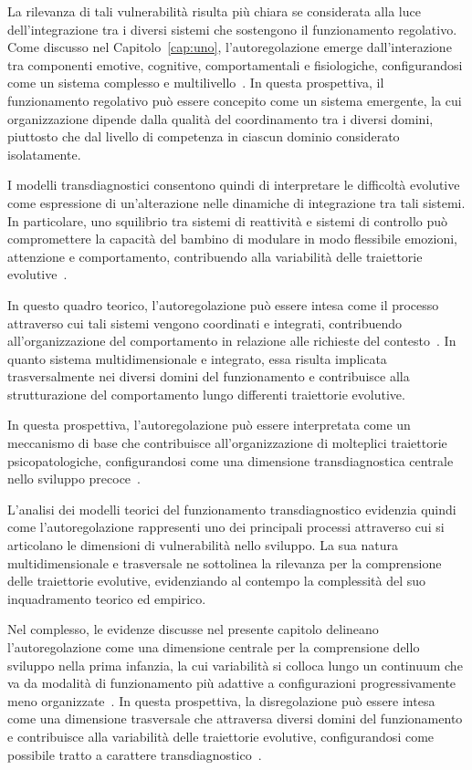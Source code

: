             La rilevanza di tali vulnerabilità risulta più chiara se considerata alla luce dell'integrazione tra i diversi sistemi che sostengono il funzionamento regolativo. Come discusso nel Capitolo~\ref{cap:uno}, l'autoregolazione emerge dall'interazione tra componenti emotive, cognitive, comportamentali e fisiologiche, configurandosi come un sistema complesso e multilivello~\cite{beauchaine2019,zelazo2015}. In questa prospettiva, il funzionamento regolativo può essere concepito come un sistema emergente, la cui organizzazione dipende dalla qualità del coordinamento tra i diversi domini, piuttosto che dal livello di competenza in ciascun dominio considerato isolatamente.

            I modelli transdiagnostici consentono quindi di interpretare le difficoltà evolutive come espressione di un'alterazione nelle dinamiche di integrazione tra tali sistemi. In particolare, uno squilibrio tra sistemi di reattività e sistemi di controllo può compromettere la capacità del bambino di modulare in modo flessibile emozioni, attenzione e comportamento, contribuendo alla variabilità delle traiettorie evolutive~\cite{beauchaine2019,zelazo2015}.

            In questo quadro teorico, l'autoregolazione può essere intesa come il processo attraverso cui tali sistemi vengono coordinati e integrati, contribuendo all'organizzazione del comportamento in relazione alle richieste del contesto~\cite{beauchaine2019}. In quanto sistema multidimensionale e integrato, essa risulta implicata trasversalmente nei diversi domini del funzionamento e contribuisce alla strutturazione del comportamento lungo differenti traiettorie evolutive.

            In questa prospettiva, l'autoregolazione può essere interpretata come un meccanismo di base che contribuisce all'organizzazione di molteplici traiettorie psicopatologiche, configurandosi come una dimensione transdiagnostica centrale nello sviluppo precoce~\cite{dalgleish2020}.

            L'analisi dei modelli teorici del funzionamento transdiagnostico evidenzia quindi come l'autoregolazione rappresenti uno dei principali processi attraverso cui si articolano le dimensioni di vulnerabilità nello sviluppo. La sua natura multidimensionale e trasversale ne sottolinea la rilevanza per la comprensione delle traiettorie evolutive, evidenziando al contempo la complessità del suo inquadramento teorico ed empirico.

            Nel complesso, le evidenze discusse nel presente capitolo delineano l'autoregolazione come una dimensione centrale per la comprensione dello sviluppo nella prima infanzia, la cui variabilità si colloca lungo un continuum che va da modalità di funzionamento più adattive a configurazioni progressivamente meno organizzate~\cite{calkins2007,cicchetti2009}. In questa prospettiva, la disregolazione può essere intesa come una dimensione trasversale che attraversa diversi domini del funzionamento e contribuisce alla variabilità delle traiettorie evolutive, configurandosi come possibile tratto a carattere transdiagnostico~\cite{beauchaine2019,astle2022}.

